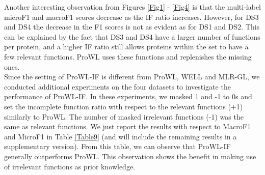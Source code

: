 \documentclass{llncs} %
\begin{document}
Another interesting observation from  Figures \ref{Fig1} - \ref{Fig4} is that the multi-label microF1 and macroF1 scores decrease as  the IF ratio increases. However, for DS3 and DS4 the decrease in the F1 scores is not as evident as for DS1 and DS2. This can be explained by the fact that DS3 and DS4 have a larger number of functions per protein, and a higher IF ratio still allows proteins within the set to have a few relevant functions. ProWL uses these functions and replenishes the missing ones.\\
\indent
Since the setting of ProWL-IF is different from ProWL, WELL and MLR-GL, we conducted additional experiments on the four datasets to investigate the performance
of ProWL-IF. In these experiments, we masked 1 and -1 to 0s and set the incomplete function ratio with respect to the relevant functions (+1) similarly to ProWL. The number of masked irrelevant functions (-1) was the same as relevant
functions. We just report the results with respect to MacroF1 and MicroF1 in Table \ref{Table9} (and will include the remaining results in a supplementary version). From
this table, we can observe  that ProWL-IF generally
outperforms ProWL. This observation shows the benefit in making use of irrelevant
functions as prior knowledge.
\begin{figure*}[h!t]
  \centering
  \caption{Replenishing missing functions of DS1. {\tiny{$\downarrow$ means the lower the better.}}}
  \label{Fig1}
\end{figure*}

\begin{figure*}[h!t]
  \centering
  \caption{Replenishing missing functions of DS2. {\tiny{$\downarrow$ means the lower the better.}}}
  \label{Fig2}
\end{figure*}
\end{document}
